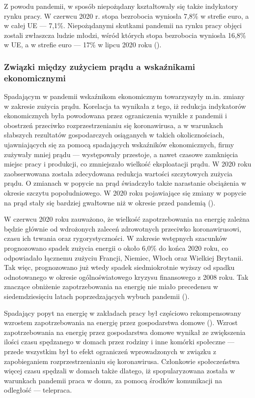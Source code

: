 \documentclass[polish, twoside, 12pt, a4paper]{article}
\theoremstyle{definition}
\theoremstyle{plain}
\theoremstyle{remark}
\begin{document}
Z powodu pandemii, w sposób niepożądany kształtowały się także indykatory rynku pracy. W czerwcu 2020 r. stopa bezrobocia wyniosła 7,8\% w strefie euro, a w całej UE --- 7,1\%. Niepożądanymi skutkami pandemii na rynku pracy objęci zostali zwłaszcza ludzie młodzi, wśród których stopa bezrobocia wyniosła 16,8\% w UE, a w strefie euro --- 17\% w lipcu 2020 roku (\cite{dziembala2021}).

\subsubsection{Związki między zużyciem prądu a wskaźnikami ekonomicznymi}

Spadającym w pandemii wskaźnikom ekonomicznym towarzyszyły m.in. zmiany w zakresie zużycia prądu. Korelacja ta wynikała z tego, iż redukcja indykatorów ekonomicznych była powodowana przez ograniczenia wynikłe z pandemii i obostrzeń przeciwko rozprzestrzenianiu się koronawirusa, a w warunkach słabszych rezultatów gospodarczych osiąganych w takich okolicznościach, ujawniających się za pomocą spadających wskaźników ekonomicznych, firmy zużywały mniej prądu --- występowały przestoje, a nawet czasowe zamknięcia miejsc pracy i produkcji, co zmniejszało wielkość eksploatacji prądu. W 2020 roku zaobserwowana została zdecydowana redukcja wartości szczytowych zużycia prądu. O zmianach w popycie na prąd świadczyło także narastanie obciążenia w okresie szczytu popołudniowego. W 2020 roku pojawiające się zmiany w popycie na prąd stały się bardziej gwałtowne niż w okresie przed pandemią (\cite{stahl2021}). 

W czerwcu 2020 roku zauważono, że wielkość zapotrzebowania na energię zależna będzie głównie od wdrożonych zaleceń zdrowotnych przeciwko koronawirusowi, czasu ich trwania oraz rygorystyczności. W zakresie wstępnych szacunków prognozowano spadek zużycia energii o około 6,0\% do końca 2020 roku, co odpowiadało łącznemu zużyciu Francji, Niemiec, Włoch oraz Wielkiej Brytanii. Tak więc, prognozowano już wtedy spadek siedmiokrotnie wyższy od spadku odnotowanego w okresie ogólnoświatowego kryzysu finansowego z 2008 roku. Tak znaczące obniżenie zapotrzebowania na energię nie miało precedensu w siedemdziesięciu latach poprzedzających wybuch pandemii (\cite{kolenda2020}). 

Spadający popyt na energię w zakładach pracy był częściowo rekompensowany wzrostem zapotrzebowania na energię przez gospodarstwa domowe (\cite{cire2023}). Wzrost zapotrzebowania na energię przez gospodarstwa domowe wynikał ze zwiększenia ilości czasu spędzanego w domach przez rodziny i inne komórki społeczne --- przede wszystkim był to efekt ograniczeń wprowadzonych w związku z zapobieganiem rozprzestrzenianiu się koronawirusa. Członkowie społeczeństwa więcej czasu spędzali w domach także dlatego, iż spopularyzowana została w warunkach pandemii praca w domu, za pomocą środków komunikacji na odległość --- telepraca. 
\end{document}
